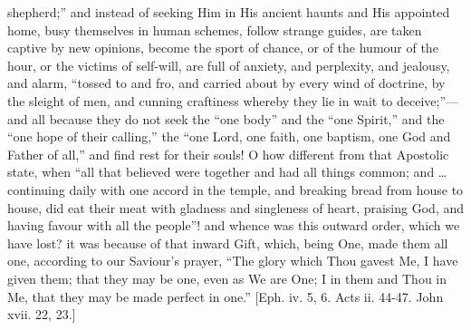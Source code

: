 shepherd;'' and instead of seeking Him in His ancient haunts and
His appointed home, busy themselves in human schemes, follow strange
guides, are taken captive by new opinions, become the sport of chance,
or of the humour of the hour, or the victims of self-will, are full of
anxiety, and perplexity, and jealousy, and alarm, ``tossed to and
fro, and carried about by every wind of doctrine, by the sleight of
men, and cunning craftiness whereby they lie in wait to deceive;''—and
all because they do not seek the ``one body'' and the
``one Spirit,'' and the ``one hope of their calling,''
the ``one Lord, one faith, one baptism, one God and Father of
all,'' and find rest for their souls! O how different from that
Apostolic state, when ``all that believed were together and had
all things common; and … continuing daily with one accord in the
temple, and breaking bread from house to house, did eat their meat
with gladness and singleness of heart, praising God, and having favour
with all the people''! and whence was this outward order, which we
have lost? it was because of that inward Gift, which, being One, made
them all one, according to our Saviour's prayer, ``The glory which
Thou gavest Me, I have given them; that they may be one, even as We
are One; I in them and Thou in Me, that they may be made perfect in
one.'' [Eph. iv. 5, 6. Acts ii. 44-47. John xvii. 22, 23.]

